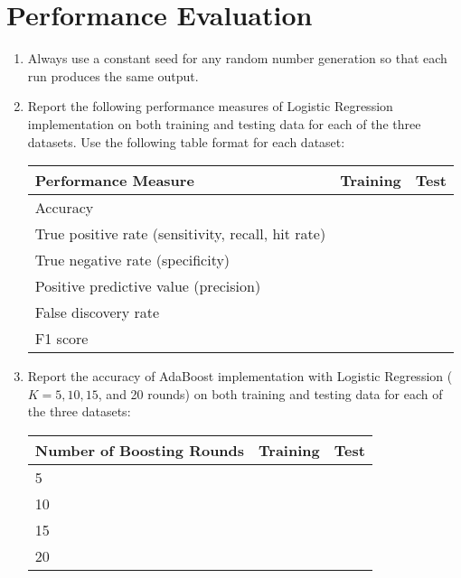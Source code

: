 \documentclass[11pt, a4paper]{article}
\begin{document}
\section{Performance Evaluation}
\begin{enumerate}
    \item Always use a constant seed for any random number generation so that each run produces the same output.
    \item Report the following performance measures of Logistic Regression implementation on both training and testing data for each of the three datasets. Use the following table format for each dataset:
    \begin{table}[h]
        \centering
        \begin{tabular}{lcc}
            \toprule
            \textbf{Performance Measure} & \textbf{Training} & \textbf{Test} \\
            \midrule
            Accuracy & & \\
            True positive rate (sensitivity, recall, hit rate) & & \\
            True negative rate (specificity) & & \\
            Positive predictive value (precision) & & \\
            False discovery rate & & \\
            F1 score & & \\
            \bottomrule
        \end{tabular}
    \end{table}
    \item Report the accuracy of AdaBoost implementation with Logistic Regression ($K=5, 10, 15$, and 20 rounds) on both training and testing data for each of the three datasets:
    \begin{table}[h]
        \centering
        \begin{tabular}{lcc}
            \toprule
            \textbf{Number of Boosting Rounds} & \textbf{Training} & \textbf{Test} \\
            \midrule
            5 & & \\
            10 & & \\
            15 & & \\
            20 & & \\
            \bottomrule
        \end{tabular}
    \end{table}
\end{enumerate}
\end{document}
